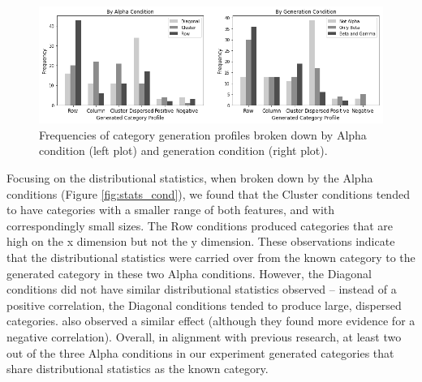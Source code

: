 \documentclass[10pt,letterpaper]{article}
\begin{document}
\begin{figure}%
\begin{center}
    \includegraphics[width=\textwidth]{Figures/profile_freq.png}
\end{center}
\caption{Frequencies of category generation profiles broken down by Alpha condition (left plot) and generation condition (right plot).}
\label{fig:profile}
\end{figure}

Focusing on the distributional statistics, when broken down by the Alpha conditions (Figure \ref{fig:stats_cond}), we found that the Cluster conditions tended to have categories with a smaller range of both features, and with correspondingly small sizes. The Row conditions produced categories that are high on the x dimension but not the y dimension. These observations indicate that the distributional statistics were carried over from the known category to the generated category in these two Alpha conditions. However, the Diagonal conditions did not have similar distributional statistics observed -- instead of a positive correlation, the Diagonal conditions tended to produce large, dispersed categories. \cite{austerweil2018catgen} also observed a similar effect (although they found more evidence for a negative correlation). Overall, in alignment with previous research, at least two out of the three Alpha conditions in our experiment generated categories that share distributional statistics as the known category.
\end{document}
